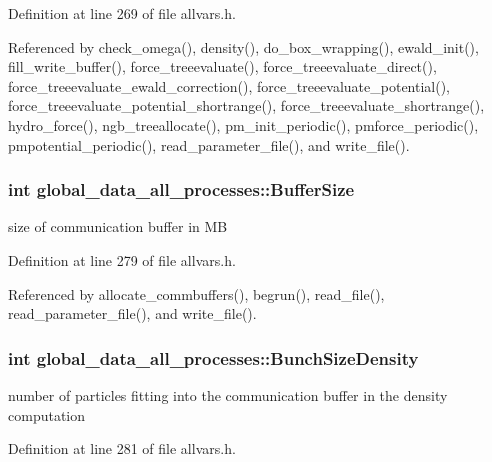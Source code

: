 Definition at line 269 of file allvars.h.



Referenced by check\_\-omega(), density(), do\_\-box\_\-wrapping(), ewald\_\-init(), fill\_\-write\_\-buffer(), force\_\-treeevaluate(), force\_\-treeevaluate\_\-direct(), force\_\-treeevaluate\_\-ewald\_\-correction(), force\_\-treeevaluate\_\-potential(), force\_\-treeevaluate\_\-potential\_\-shortrange(), force\_\-treeevaluate\_\-shortrange(), hydro\_\-force(), ngb\_\-treeallocate(), pm\_\-init\_\-periodic(), pmforce\_\-periodic(), pmpotential\_\-periodic(), read\_\-parameter\_\-file(), and write\_\-file().

\hypertarget{structglobal__data__all__processes_abd0120516eb7fee5a534464546fc5c7f}{
\subsubsection[{BufferSize}]{\setlength{\rightskip}{0pt plus 5cm}int {\bf global\_\-data\_\-all\_\-processes::BufferSize}}}
\label{structglobal__data__all__processes_abd0120516eb7fee5a534464546fc5c7f}
size of communication buffer in MB 

Definition at line 279 of file allvars.h.



Referenced by allocate\_\-commbuffers(), begrun(), read\_\-file(), read\_\-parameter\_\-file(), and write\_\-file().

\hypertarget{structglobal__data__all__processes_a9ab84bfa2f66ade551d613aeb3921d76}{
\subsubsection[{BunchSizeDensity}]{\setlength{\rightskip}{0pt plus 5cm}int {\bf global\_\-data\_\-all\_\-processes::BunchSizeDensity}}}
\label{structglobal__data__all__processes_a9ab84bfa2f66ade551d613aeb3921d76}
number of particles fitting into the communication buffer in the density computation 

Definition at line 281 of file allvars.h.



